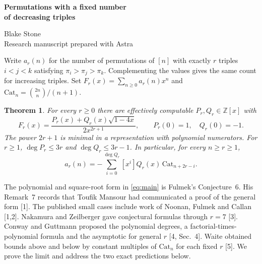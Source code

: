 \documentclass[11pt,letterpaper]{article}
\newtheorem{theorem}{Theorem}
\newcommand{\Cat}{\mathrm{Cat}}
\begin{document}
\thispagestyle{plain}
\begin{center}
{\LARGE\bfseries Permutations with a fixed number\\[2pt] of decreasing triples\par}
\vspace{0.5em}Blake Stone\\{\small Research manuscript prepared with Astra}
\end{center}
\begin{abstract}
For every prescribed number of decreasing triples we prove the generating-function form conjectured by Fulmek. Its power of the denominator is sharp. Conway and Guttmann's more precise predictions for the numerator degrees and the coefficient formula fail at eight and seven triples, respectively. Their fixed-count asymptotic holds, with a computable positive rational amplitude. The amplitudes have a finite exponential growth rate exceeding $3.19$. The proof splits a permutation diagram into finitely many short pieces joined by ordinary Dyck walks.
\end{abstract}

Write $a_r(n)$ for the number of permutations of $[n]$ with exactly $r$ triples $i<j<k$ satisfying $\pi_i>\pi_j>\pi_k$. Complementing the values gives the same count for increasing triples. Set $F_r(x)=\sum_{n\ge0}a_r(n)x^n$ and $\Cat_n=\binom{2n}{n}/(n+1)$.

\begin{theorem}\label{form}
For every $r\ge0$ there are effectively computable $P_r,Q_r\in\mathbb Z[x]$ with
\begin{equation}
 F_r(x)=\frac{P_r(x)+Q_r(x)\sqrt{1-4x}}{2x^{2r+1}},
 \qquad P_r(0)=1,\quad Q_r(0)=-1 . \label{eq:main}
\end{equation}
The power $2r+1$ is minimal in a representation with polynomial numerators. For $r\ge1$, $\deg P_r\le3r$ and $\deg Q_r\le3r-1$. In particular, for every $n\ge r\ge1$,
\begin{equation}
 a_r(n)=-\sum_{i=0}^{\deg Q_r}[x^i]Q_r(x)\,\Cat_{n+2r-i}. \label{shift}
\end{equation}
\end{theorem}

The polynomial and square-root form in \eqref{eq:main} is Fulmek's Conjecture~6. His Remark~7 records that Toufik Mansour had communicated a proof of the general form [1]. The published small cases include work of Noonan, Fulmek and Callan [1,2]. Nakamura and Zeilberger gave conjectural formulas through $r=7$ [3]. Conway and Guttmann proposed the polynomial degrees, a factorial-times-polynomial formula and the asymptotic for general $r$ [4, Sec.~4]. Waite obtained bounds above and below by constant multiples of $\Cat_n$ for each fixed $r$ [5]. We prove the limit and address the two exact predictions below.
\end{document}
